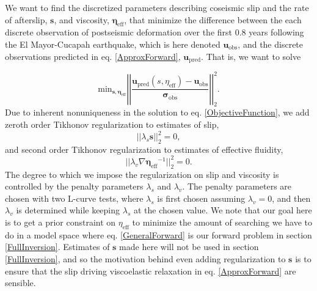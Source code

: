 \documentclass[12pt]{article}
\begin{document}
We want to find the discretized parameters describing coseismic slip and the rate of afterslip, $\mathbf{s}$, and viscosity, $\mathbf{\eta_{\mathrm{eff}}}$, that minimize the difference between the each discrete observation of postseismic deformation over the first 0.8 years following the El Mayor-Cucapah earthquake, which is here denoted $\mathbf{u_\mathrm{obs}}$, and the discrete observations predicted in eq. \ref{ApproxForward}, $\mathbf{u_\mathrm{pred}}$. That is, we want to solve

\begin{equation}\label{ObjectiveFunction}
 \mathrm{min}_{\mathbf{s},\mathbf{\eta_\mathrm{eff}}} \left|\left|
 \frac{\mathbf{u_\mathrm{pred}}(s,\eta_\mathrm{eff}) - \mathbf{u_\mathrm{obs}}}
 {\mathbf{\sigma_\mathrm{obs}}}\right|\right|_2^2.
\end{equation} 
Due to inherent nonuniqueness in the solution to eq. \ref{ObjectiveFunction}, we add zeroth order Tikhonov regularization to estimates of slip,
\begin{equation}\label{Misfit}
||\lambda_s \mathbf{s}||_2^2=0,
\end{equation}
and second order Tikhonov regularization to estimates of effective fluidity, 
\begin{equation}
||\lambda_v \nabla \mathbf{\eta_{\mathrm{eff}}}^{-1}||_2^2=0.
\end{equation}
The degree to which we impose the regularization on slip and viscosity is controlled by the penalty parameters $\lambda_s$ and $\lambda_v$.  The penalty parameters are chosen with two L-curve tests, where $\lambda_s$ is first chosen assuming $\lambda_v=0$, and then $\lambda_v$ is determined while keeping $\lambda_s$ at the chosen value.  We note that our goal here is to get a prior constraint on $\eta_{\mathrm{eff}}$ to minimize the amount of searching we have to do in a model space where eq. \ref{GeneralForward} is our forward problem in section \ref{FullInversion}.  Estimates of $\mathbf{s}$ made here will not be used in section \ref{FullInversion}, and so the motivation behind even adding regularization to $\mathbf{s}$ is to ensure that the slip driving viscoelastic relaxation in eq. \ref{ApproxForward} are sensible.  
\end{document}
